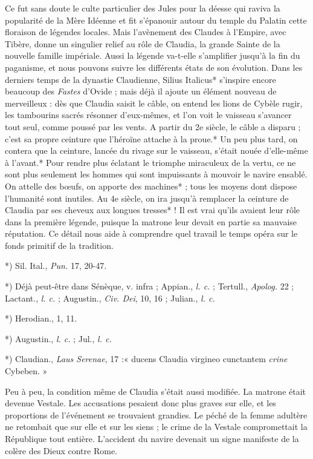 \documentclass[a4paper, 11pt, oneside, polutonikogreek, french]{article}
\begin{document}
Ce fut sans doute le culte particulier des Jules pour la déesse qui raviva la popularité de la Mère Idéenne et fit s'épanouir autour du temple du Palatin cette floraison de légendes locales. Mais l'avènement des Claudes à l'Empire, avec Tibère, donne un singulier relief au rôle de Claudia, la grande Sainte de la nouvelle famille impériale. Aussi la légende va-t-elle s'amplifier jusqu'à la fin du paganisme, et nous pouvons suivre les différents états de son évolution. Dans les derniers temps de la dynastie Claudienne, Silius Italicus* s'inspire encore beaucoup des \emph{Fastes} d'Ovide ; mais déjà il ajoute un élément nouveau de merveilleux : dès que Claudia saisit le câble, on entend les lions de Cybèle rugir, les tambourins sacrés résonner d'eux-mêmes, et l'on voit le vaisseau s'avancer tout seul, comme poussé par les vents. A partir du 2e siècle, le câble a disparu ; c'est sa propre ceinture que l'héroïne attache à la proue.* Un peu plus tard, on contera que la ceinture, lancée du rivage sur le vaisseau, s'était nouée d'elle-même à l'avant.* Pour rendre plus éclatant le triomphe miraculeux de la vertu, ce ne sont plus seulement les hommes qui sont impuissants à mouvoir le navire ensablé. On attelle des bœufs, on apporte des machines* ; tous les moyens dont dispose l'humanité sont inutiles. Au 4e siècle, on ira jusqu'à remplacer la ceinture de Claudia par ses cheveux aux longues tresses* ! Il est vrai qu'ils avaient leur rôle dans la première légende, puisque la matrone leur devait en partie sa mauvaise réputation. Ce détail nous aide à comprendre quel travail le temps opéra sur le fonds primitif de la tradition.

*) Sil. Ital., \emph{Pun.} 17, 20-47.

*) Déjà peut-être dans Sénèque, v. infra ; Appian., \emph{l. c.} ; Tertull., \emph{Apolog.} 22 ; Lactant., \emph{l. c.} ; Augustin., \emph{Civ. Dei}, 10, 16 ; Julian., \emph{l. c.}

*) Herodian., 1, 11.

*) Augustin., \emph{l. c.} ; Jul., \emph{l. c.}

*) Claudian., \emph{Laus Serenae}, 17 :« ducens Claudia virgineo cunctantem \emph{crine} Cybeben. »

Peu à peu, la condition même de Claudia s'était aussi modifiée. La matrone était devenue Vestale. Les accusations pesaient donc plus graves sur elle, et les proportions de l'événement se trouvaient grandies. Le péché de la femme adultère ne retombait que sur elle et sur les siens ; le crime de la Vestale compromettait la République tout entière. L'accident du navire devenait un signe manifeste de la colère des Dieux contre Rome.
\end{document}
